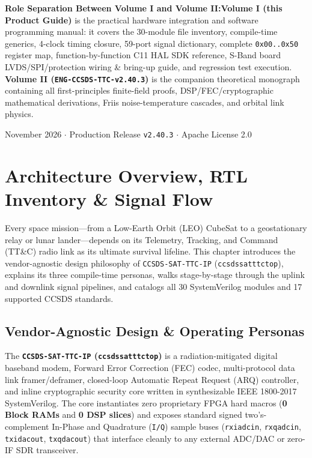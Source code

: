 \documentclass[10pt,a4paper]{article}
\renewcommand{\_}{\origunderscore\penalty0\hskip0pt\relax}
\newcommand{\archnote}[2]{%
  \par\vspace{4pt}\noindent\colorbox{boxbg}{%
    \parbox{\dimexpr\textwidth-2\fboxsep\relax}{%
      \vspace{4pt}\raggedright\textbf{\sffamily\color{navy}#1:}\hspace{0.4em}#2\vspace{4pt}%
    }%
  }\par\vspace{4pt}%
}
\numberwithin{table}{section}
\numberwithin{figure}{section}
\numberwithin{equation}{section}
\begin{document}
\begin{titlepage}
    \vfill
    \archnote{Role Separation Between Volume I and Volume II}{\textbf{Volume I (this Product Guide)} is the practical hardware integration and software programming manual: it covers the 30-module file inventory, compile-time generics, 4-clock timing closure, 59-port signal dictionary, complete \texttt{0x00..0x50} register map, function-by-function C11 HAL SDK reference, S-Band board LVDS/SPI/protection wiring \& bring-up guide, and regression test execution. \textbf{Volume II (\texttt{ENG-CCSDS-TTC-v2.40.3})} is the companion theoretical monograph containing all first-principles finite-field proofs, DSP/FEC/cryptographic mathematical derivations, Friis noise-temperature cascades, and orbital link physics.}
    \vfill
    {\small\sffamily November 2026 $\cdot$ Production Release \texttt{v2.40.3} $\cdot$ Apache License 2.0\par}
\end{titlepage}

\begingroup
\setlength{\parskip}{1pt}
\tableofcontents
\endgroup
\newpage

\section{Architecture Overview, RTL Inventory \& Signal Flow}

Every space mission—from a Low-Earth Orbit (LEO) CubeSat to a geostationary relay or lunar lander—depends on its Telemetry, Tracking, and Command (TT\&C) radio link as its ultimate survival lifeline. This chapter introduces the vendor-agnostic design philosophy of \texttt{CCSDS-SAT-TTC-IP} (\texttt{ccsds\_sat\_ttc\_top}), explains its three compile-time personas, walks stage-by-stage through the uplink and downlink signal pipelines, and catalogs all 30 SystemVerilog modules and 17 supported CCSDS standards.

\subsection{Vendor-Agnostic Design \& Operating Personas}
The \textbf{\texttt{CCSDS-SAT-TTC-IP} (\texttt{ccsds\_sat\_ttc\_top})} is a radiation-mitigated digital baseband modem, Forward Error Correction (FEC) codec, multi-protocol data link framer/deframer, closed-loop Automatic Repeat Request (ARQ) controller, and inline cryptographic security core written in synthesizable IEEE 1800-2017 SystemVerilog. The core instantiates zero proprietary FPGA hard macros (\textbf{0 Block RAMs} and \textbf{0 DSP slices}) and exposes standard signed two's-complement In-Phase and Quadrature (\texttt{I/Q}) sample buses (\texttt{rx\_i\_adc\_in}, \texttt{rx\_q\_adc\_in}, \texttt{tx\_i\_dac\_out}, \texttt{tx\_q\_dac\_out}) that interface cleanly to any external ADC/DAC or zero-IF SDR transceiver.
\end{document}
